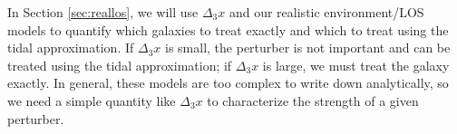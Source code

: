 In Section \ref{sec:reallos}, we will use $\Delta_3 x$ and our realistic environment/LOS models to quantify which galaxies to treat exactly and which to treat using the tidal approximation. If $\Delta_3x$ is small, the perturber is not important and can be treated using the tidal approximation; if $\Delta_3 x$ is large, we must treat the galaxy exactly. In general, these models are too complex to write down analytically, so we need a simple quantity like $\Delta_3 x$ to characterize the strength of a given perturber. 
  